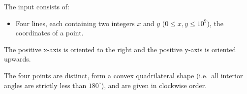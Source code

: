 
    The input consists of:
    \begin{itemize}
        \item Four lines, each containing two integers $x$ and $y$ ($0\leq x,y\leq 10^9$), the coordinates of a point.
    \end{itemize}
    The positive x-axis is oriented to the right and the positive y-axis is oriented upwards.

    The four points are distinct,
    form a convex quadrilateral shape (i.e.~all interior angles are strictly less than $180^\circ$),
    and are given in clockwise order.
